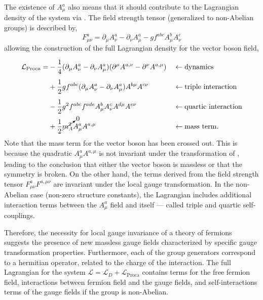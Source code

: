 The existence of $A_\mu^a$ also means that it should contribute to the Lagrangian density of the system via .
The field strength tensor (generalized to non-Abelian groups) is described by,
\begin{equation}
    \label{eq:field_strength_tensor}
    F_{\mu\nu}^a = \partial_\mu A_\nu^a - \partial_\nu A_\mu^a - g f^{abc} A_\mu^b A_\nu^c
\end{equation}
allowing the construction of the full Lagrangian density for the vector boson field,
\begin{align}
    \label{eq:boson}
    \mathcal{L}_\text{Proca} =
     & \vphantom{\cancelto{0}{m_A^2}} -\frac{1}{4}(\partial_\mu A_\nu^a - \partial_\nu A_\mu^a) (\partial^\mu A^{a,\nu} - \partial^\nu A^{a,\mu}) &  & \leftarrow \text{dynamics}            \\
     & \vphantom{\cancelto{0}{m_A^2}} + \frac{1}{2} g f^{abc} (\partial_\mu A_\nu^a - \partial_\nu A_\mu^a) A^{b\mu} A^{c\nu}                     &  & \leftarrow \text{triple interaction}  \\
     & \vphantom{\cancelto{0}{m_A^2}} - \frac{1}{2} g^2 f^{abc} f^{ade} A_\mu^b A_\nu^c A^{d\mu} A^{e\nu}                                         &  & \leftarrow \text{quartic interaction} \\
     & + \frac{1}{2} \cancelto{0}{m_A^2} A_\mu^a A^{a,\mu}                                                                                        &  & \leftarrow \text{mass term}.
\end{align}
Note that the mass term for the vector boson has been crossed out.
This is because the quadratic $A_\mu^a A^{a,\mu}$ is not invariant under the transformation of , leading to the conclusion that either the vector boson is massless or that the symmetry is broken.
On the other hand, the terms derived from the field strength tensor $F_{\mu\nu}^a F^{a,\mu\nu}$ are invariant under the local gauge transformation.
In the non-Abelian case (non-zero structure constants), the Lagrangian includes additional interaction terms between the $A_\mu^a$ field and itself --- called triple and quartic self-couplings.

Therefore, the necessity for local gauge invariance of a theory of fermions suggests the presence of new massless gauge fields characterized by specific gauge transformation properties.
Furthermore, each of the group generators correspond to a hermitian operator, related to the charge of the interaction.
The full Lagrangian for the system $\mathcal{L} = \mathcal{L}_D + \mathcal{L}_\text{Proca}$ contains terms for the free fermion field, interactions between fermion field and the gauge fields, and self-interactions terms of the gauge fields if the group is non-Abelian.

